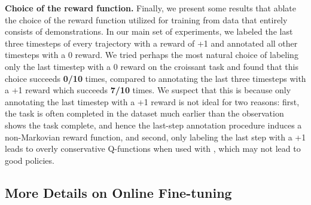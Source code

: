 \documentclass[conference]{IEEEtran}
\begin{document}
\begin{table}
\centering
{}
\vspace{0.1cm}
\caption{\footnotesize{\textbf{Relative performance of \methodname with batch normalization with respect to \methodname with group normalization.} Observe that while utilizing batch normalization in \methodname can be sometimes more effective than using group normalization (e.g., take croissant out of metallic bowl task), it may also be highly ineffective and can reduce success rates significantly in other tasks. The performance numbers to the left of the $\rightarrow$ correspond to the performance of \methodname with group normalization and the performance to the right of $\rightarrow$ is the performance with batch normalization.}}
\label{tab:batch_norm}
\end{table}


\textbf{Choice of the reward function.} Finally, we present some results that ablate the choice of the reward function utilized for training \methodname from data that entirely consists of demonstrations. In our main set of experiments, we labeled the last three timesteps of every trajectory with a reward of +1 and annotated all other timesteps with a 0 reward. We tried perhaps the most natural choice of labeling only the last timestep with a 0 reward on the croissant task and found that this choice succeeds \textbf{0/10} times, compared to annotating the last three timesteps with a +1 reward which succeeds \textbf{7/10} times. We suspect that this is because only annotating the last timestep with a +1 reward is not ideal for two reasons: first, the task is often completed in the dataset much earlier than the observation shows the task complete, and hence the last-step annotation procedure induces a non-Markovian reward function, and second, only labeling the last step with a +1 leads to overly conservative Q-functions when used with \methodname, which may not lead to good policies.

\subsection{More Details on Online Fine-tuning}
\label{app:online_finetuning}
\end{document}
